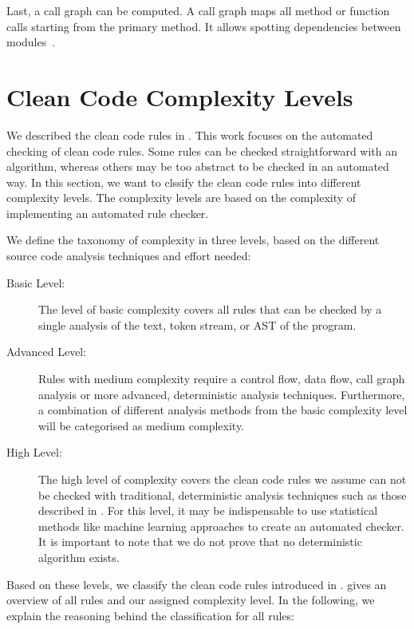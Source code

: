 Last, a call graph can be computed. A call graph maps all method or function calls starting from the primary method. It allows spotting dependencies between modules~\cite{prahofer_static_2017}.

\section{Clean Code Complexity Levels}\label{sec:cc_complexity_levels}
We described the clean code rules in . This work focuses on the automated checking of clean code rules. Some rules can be checked straightforward with an algorithm, whereas others may be too abstract to be checked in an automated way. In this section, we want to clssify the clean code rules into different complexity levels. The complexity levels are based on the complexity of implementing an automated rule checker. 

We define the taxonomy of complexity in three levels, based on the different source code analysis techniques and effort needed:
\begin{description}
    \item[Basic Level:] The level of basic complexity covers all rules that can be checked by a single analysis of the text, token stream, or AST of the program.
    \item[Advanced Level:] Rules with medium complexity require a control flow, data flow, call graph analysis or more advanced, deterministic analysis techniques. Furthermore, a combination of different analysis methods from the basic complexity level will be categorised as medium complexity. 
    \item[High Level:] The high level of complexity covers the clean code rules we assume can not be checked with traditional, deterministic analysis techniques such as those described in . For this level, it may be indispensable to use statistical methods like machine learning approaches to create an automated checker. It is important to note that we do not prove that no deterministic algorithm exists. 
\end{description}

Based on these levels, we classify the clean code rules introduced in .  gives an overview of all rules and our assigned complexity level. In the following, we explain the reasoning behind the classification for all rules:


